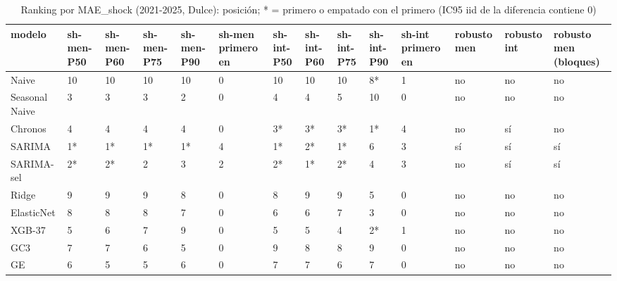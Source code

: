 \begin{table}[H]
\centering
\small
\caption{Ranking por MAE\_shock (2021-2025, Dulce): posición; * = primero o empatado con el primero (IC95 iid de la diferencia contiene 0)}
\label{tab:T08_ranking_shock_principal_2021_2025_dulce}
\begin{tabular}{llllllllllllll}
\toprule
modelo & sh-men-P50 & sh-men-P60 & sh-men-P75 & sh-men-P90 & sh-men primero en & sh-int-P50 & sh-int-P60 & sh-int-P75 & sh-int-P90 & sh-int primero en & robusto men & robusto int & robusto men (bloques) \\
\midrule
Naive & 10 & 10 & 10 & 10 & 0 & 10 & 10 & 10 & 8* & 1 & no & no & no \\
Seasonal Naive & 3 & 3 & 3 & 2 & 0 & 4 & 4 & 5 & 10 & 0 & no & no & no \\
Chronos & 4 & 4 & 4 & 4 & 0 & 3* & 3* & 3* & 1* & 4 & no & sí & no \\
SARIMA & 1* & 1* & 1* & 1* & 4 & 1* & 2* & 1* & 6 & 3 & sí & sí & sí \\
SARIMA-sel & 2* & 2* & 2 & 3 & 2 & 2* & 1* & 2* & 4 & 3 & no & sí & sí \\
Ridge & 9 & 9 & 9 & 8 & 0 & 8 & 9 & 9 & 5 & 0 & no & no & no \\
ElasticNet & 8 & 8 & 8 & 7 & 0 & 6 & 6 & 7 & 3 & 0 & no & no & no \\
XGB-37 & 5 & 6 & 7 & 9 & 0 & 5 & 5 & 4 & 2* & 1 & no & no & no \\
GC3 & 7 & 7 & 6 & 5 & 0 & 9 & 8 & 8 & 9 & 0 & no & no & no \\
GE & 6 & 5 & 5 & 6 & 0 & 7 & 7 & 6 & 7 & 0 & no & no & no \\
\bottomrule
\end{tabular}
\end{table}